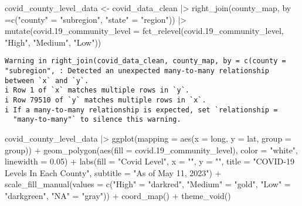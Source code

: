 \documentclass[
  letterpaper,
  DIV=11,
  numbers=noendperiod]{scrartcl}
\newenvironment{Shaded}{\begin{snugshade}}{\end{snugshade}}
\newcommand{\AttributeTok}[1]{\textcolor[rgb]{0.40,0.45,0.13}{#1}}
\newcommand{\FloatTok}[1]{\textcolor[rgb]{0.68,0.00,0.00}{#1}}
\newcommand{\FunctionTok}[1]{\textcolor[rgb]{0.28,0.35,0.67}{#1}}
\newcommand{\NormalTok}[1]{\textcolor[rgb]{0.00,0.23,0.31}{#1}}
\newcommand{\OtherTok}[1]{\textcolor[rgb]{0.00,0.23,0.31}{#1}}
\newcommand{\SpecialCharTok}[1]{\textcolor[rgb]{0.37,0.37,0.37}{#1}}
\newcommand{\StringTok}[1]{\textcolor[rgb]{0.13,0.47,0.30}{#1}}
\begin{document}
\begin{Shaded}
\begin{Highlighting}[]
\NormalTok{covid\_county\_level\_data }\OtherTok{\textless{}{-}}\NormalTok{ covid\_data\_clean }\SpecialCharTok{|\textgreater{}}
  \FunctionTok{right\_join}\NormalTok{(county\_map, }\AttributeTok{by =}\FunctionTok{c}\NormalTok{(}\StringTok{"county"} \OtherTok{=} \StringTok{"subregion"}\NormalTok{, }\StringTok{"state"} \OtherTok{=} \StringTok{"region"}\NormalTok{)) }\SpecialCharTok{|\textgreater{}}
  \FunctionTok{mutate}\NormalTok{(}\AttributeTok{covid.19\_community\_level =} \FunctionTok{fct\_relevel}\NormalTok{(covid}\FloatTok{.19}\NormalTok{\_community\_level, }\StringTok{"High"}\NormalTok{, }\StringTok{"Medium"}\NormalTok{, }\StringTok{"Low"}\NormalTok{))}
\end{Highlighting}
\end{Shaded}

\begin{verbatim}
Warning in right_join(covid_data_clean, county_map, by = c(county = "subregion", : Detected an unexpected many-to-many relationship between `x` and `y`.
i Row 1 of `x` matches multiple rows in `y`.
i Row 79510 of `y` matches multiple rows in `x`.
i If a many-to-many relationship is expected, set `relationship =
  "many-to-many"` to silence this warning.
\end{verbatim}

\begin{Shaded}
\begin{Highlighting}[]
\NormalTok{covid\_county\_level\_data }\SpecialCharTok{|\textgreater{}}
  \FunctionTok{ggplot}\NormalTok{(}\AttributeTok{mapping =} \FunctionTok{aes}\NormalTok{(}\AttributeTok{x =}\NormalTok{ long, }\AttributeTok{y =}\NormalTok{ lat,}
                       \AttributeTok{group =}\NormalTok{ group)) }\SpecialCharTok{+}
  \FunctionTok{geom\_polygon}\NormalTok{(}\FunctionTok{aes}\NormalTok{(}\AttributeTok{fill =}\NormalTok{ covid}\FloatTok{.19}\NormalTok{\_community\_level), }\AttributeTok{color =} \StringTok{"white"}\NormalTok{, }\AttributeTok{linewidth =} \FloatTok{0.05}\NormalTok{) }\SpecialCharTok{+}
  \FunctionTok{labs}\NormalTok{(}\AttributeTok{fill =} \StringTok{"Covid Level"}\NormalTok{,}
       \AttributeTok{x =} \StringTok{""}\NormalTok{,}
       \AttributeTok{y =} \StringTok{""}\NormalTok{,}
       \AttributeTok{title =} \StringTok{"COVID{-}19 Levels In Each County"}\NormalTok{,}
       \AttributeTok{subtitle =} \StringTok{"As of May 11, 2023"}\NormalTok{) }\SpecialCharTok{+}
  \FunctionTok{scale\_fill\_manual}\NormalTok{(}\AttributeTok{values =} \FunctionTok{c}\NormalTok{(}\StringTok{"High"} \OtherTok{=} \StringTok{"darkred"}\NormalTok{, }\StringTok{"Medium"} \OtherTok{=} \StringTok{"gold"}\NormalTok{, }\StringTok{"Low"} \OtherTok{=} \StringTok{"darkgreen"}\NormalTok{, }\StringTok{"NA"} \OtherTok{=} \StringTok{"gray"}\NormalTok{)) }\SpecialCharTok{+}
  \FunctionTok{coord\_map}\NormalTok{() }\SpecialCharTok{+}
  \FunctionTok{theme\_void}\NormalTok{() }
\end{Highlighting}
\end{Shaded}
\end{document}
